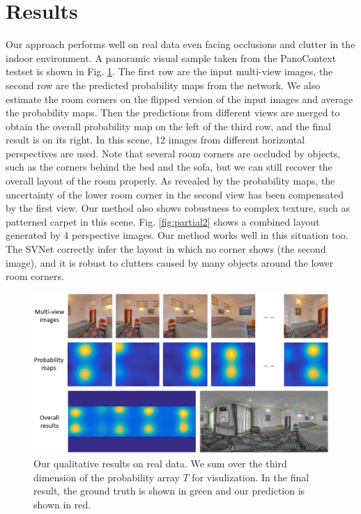 

\section{Results}
Our approach performs well on real data even facing occlusions and clutter in the indoor environment. A panoramic visual sample taken from the PanoContext testset is shown in Fig. \ref{fig:results2}.
%
The first row are the input multi-view images, the second row are the predicted probability maps from the network. We also estimate the room corners on the flipped version of the input images and average the probability maps. Then the predictions from different views are merged to obtain the overall probability map on the left of the third row, and the final result is on its right. 
%
In this scene, 12 images from different horizontal perspectives are used. Note that several room corners are occluded by objects, such as the corners behind the bed and the sofa, but we can still recover the overall layout of the room properly. As revealed by the probability maps, the uncertainty of the lower room corner in the second view has been compensated by the first view. Our method also shows robustness to complex texture, such as patterned carpet in this scene. 
%
Fig. \ref{fig:partial2} shows a combined layout generated by 4 perspective images. Our method works well in this situation too. The SVNet correctly infer the layout in which no corner shows (the second image), and it is robust to clutters caused by many objects around the lower room corners.


\begin{figure}[ht]
	\centering
	\includegraphics[width=\linewidth]{figs/results2.png}
	\caption{Our qualitative results on real data. We sum over the third dimension of the probability array $T$ for visulization. In the final result, the ground truth is shown in green and our prediction is shown in red. }
	\label{fig:results2}
\end{figure}

